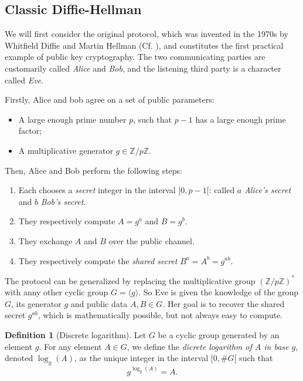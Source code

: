 \documentclass{article}
\theoremstyle{theorem}
\theoremstyle{definition}
\newtheorem{definition}{Definition}
\begin{document}
\subsection{Classic Diffie-Hellman}

We will first consider the original protocol, which was invented in the 1970s by Whitfield Diffie and Martin Hellman (Cf. \cite{DiffieHellman}), and constitutes the first practical example of public key cryptography. The two communicating parties are customarily called \textit{Alice} and \textit{Bob}, and the listening third party is a character called \textit{Eve}. 

Firstly, Alice and bob agree on a set of public parameters:
	\begin{itemize}
		\item A large enough prime number $p$, such that $p - 1$ has a large enough prime factor;
		
		\item A multiplicative generator $g \in \mathbb{Z}/p\mathbb{Z}$.
		
	\end{itemize}
Then, Alice and Bob perform the following steps:
	
	\begin{enumerate}
		\item Each chooses a \textit{secret} integer in the interval $]0, p - 1[$: called $a$ \textit{Alice's secret} and $b$ \textit{Bob's secret}.
		
		\item They respectively compute $A = g^a$ and $B = g^b$.
		
		\item They exchange $A$ and $B$ over the public channel.
		
		\item They respectively compute the \textit{shared secret} $B^a = A^b = g^{ab}$.
	\end{enumerate}

The protocol can be generalized by replacing the multiplicative group $(\mathbb{Z}/p\mathbb{Z})^{\ast}$ with anny other cyclic group $G = \langle g \rangle$. So Eve is given the knowledge of the group $G$, its generator $g$ and public data $A, B \in G$. Her goal is to recover the shared secret $g^{ab}$, which is mathematically possible, but not always easy to compute.

\begin{definition}[Discrete logarithm]
	Let $G$ be a cyclic group generated by an element $g$. For any element $A \in G$, we define the \textit{dicrete logarithm of $A$ in base $g$}, denoted $\log_g(A)$, as the unique integer in the interval $[0, \#G[$ such that
		\[ g^{\log_g(A)} = A. \] 
\end{definition}
\end{document}
